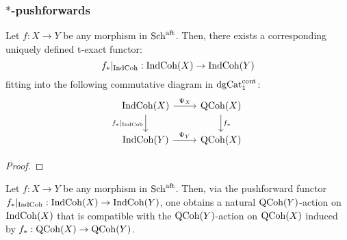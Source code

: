             \subsubsection{\texorpdfstring{$*$}{}-pushforwards}
                \begin{proposition} \label{prop: indcoh_*_pushforwards}
                    Let $f: X \to Y$ be any morphism in $\mathrm{Sch}^{\mathrm{aft}}$. Then, there exists a corresponding uniquely defined t-exact functor:
                        $$f_*|_{\mathrm{Ind}\mathrm{Coh}}: \mathrm{Ind}\mathrm{Coh}(X) \to \mathrm{Ind}\mathrm{Coh}(Y)$$
                    fitting into the following commutative diagram in $\mathrm{dg}\mathrm{Cat}^{\mathrm{cont}}_1$:
                        $$
                            \begin{tikzcd}
                            	{\Ind\Coh(X)} & {\QCoh(X)} \\
                            	{\Ind\Coh(Y)} & {\QCoh(X)}
                            	\arrow["{\Psi_X}", from=1-1, to=1-2]
                            	\arrow["{f_*|_{\Ind\Coh}}"', from=1-1, to=2-1]
                            	\arrow["{f_*}", from=1-2, to=2-2]
                            	\arrow["{\Psi_Y}", from=2-1, to=2-2]
                            \end{tikzcd}
                        $$
                \end{proposition}
                    \begin{proof}
                        
                    \end{proof}
                \begin{corollary} \label{coro: *_pushforwards_and_qcoh_actions}
                    Let $f: X \to Y$ be any morphism in $\mathrm{Sch}^{\mathrm{aft}}$. Then, via the pushforward functor $f_*|_{\mathrm{Ind}\mathrm{Coh}}: \mathrm{Ind}\mathrm{Coh}(X) \to \mathrm{Ind}\mathrm{Coh}(Y)$, one obtains a natural $\mathrm{QCoh}(Y)$-action on $\mathrm{Ind}\mathrm{Coh}(X)$ that is compatible with the $\mathrm{QCoh}(Y)$-action on $\mathrm{QCoh}(X)$ induced by $f_*: \mathrm{QCoh}(X) \to \mathrm{QCoh}(Y)$.
                \end{corollary}
                
